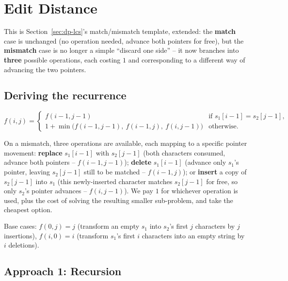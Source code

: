 \section{Edit Distance}
\label{sec:dp-edit-distance}


\begin{patternbox}
This is Section~\ref{sec:dp-lcs}'s match/mismatch template, extended:
the \textbf{match} case is unchanged (no operation needed, advance both
pointers for free), but the \textbf{mismatch} case is no longer a simple
``discard one side'' -- it now branches into \textbf{three} possible
operations, each costing $1$ and corresponding to a different way of
advancing the two pointers.
\end{patternbox}

\subsection*{Deriving the recurrence}

\[
  f(i,j) =
  \begin{cases}
    f(i{-}1,j{-}1) & \text{if } s_1[i{-}1]=s_2[j{-}1], \\
    1 + \min\big(f(i{-}1,j{-}1),\ f(i{-}1,j),\ f(i,j{-}1)\big) & \text{otherwise.}
  \end{cases}
\]

On a mismatch, three operations are available, each mapping to a
specific pointer movement: \textbf{replace} $s_1[i-1]$ with
$s_2[j-1]$ (both characters consumed, advance both pointers --
$f(i{-}1,j{-}1)$); \textbf{delete} $s_1[i-1]$ (advance only $s_1$'s
pointer, leaving $s_2[j-1]$ still to be matched -- $f(i{-}1,j)$); or
\textbf{insert} a copy of $s_2[j-1]$ into $s_1$ (this newly-inserted
character matches $s_2[j-1]$ for free, so only $s_2$'s pointer advances
-- $f(i,j{-}1)$). We pay $1$ for whichever operation is used, plus the
cost of solving the resulting smaller sub-problem, and take the cheapest
option.

Base cases: $f(0,j)=j$ (transform an empty $s_1$ into $s_2$'s first $j$
characters by $j$ insertions), $f(i,0)=i$ (transform $s_1$'s first $i$
characters into an empty string by $i$ deletions).

\subsection*{Approach 1: Recursion}

